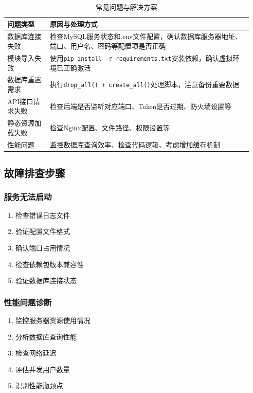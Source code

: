 \documentclass[a4paper]{article}
\begin{document}
\begin{table}[H]
\centering
\caption{常见问题与解决方案}
\begin{tabular}{|p{4cm}|p{11cm}|}
\hline
\textbf{问题类型} & \textbf{原因与处理方式} \\
\hline
数据库连接失败 & 检查MySQL服务状态和.env文件配置，确认数据库服务器地址、端口、用户名、密码等配置项是否正确 \\
\hline
模块导入失败 & 使用\texttt{pip install -r requirements.txt}安装依赖，确认虚拟环境已正确激活 \\
\hline
数据库重置需求 & 执行\texttt{drop\_all() + create\_all()}处理脚本，注意备份重要数据 \\
\hline
API接口请求失败 & 检查后端是否监听对应端口、Token是否过期、防火墙设置等 \\
\hline
静态资源加载失败 & 检查Nginx配置、文件路径、权限设置等 \\
\hline
性能问题 & 监控数据库查询效率、检查代码逻辑、考虑增加缓存机制 \\
\hline
\end{tabular}
\end{table}

\subsection{故障排查步骤}

\subsubsection{服务无法启动}

\begin{enumerate}
    \item 检查错误日志文件
    \item 验证配置文件格式
    \item 确认端口占用情况
    \item 检查依赖包版本兼容性
    \item 验证数据库连接状态
\end{enumerate}

\subsubsection{性能问题诊断}

\begin{enumerate}
    \item 监控服务器资源使用情况
    \item 分析数据库查询性能
    \item 检查网络延迟
    \item 评估并发用户数量
    \item 识别性能瓶颈点
\end{enumerate}
\end{document}
